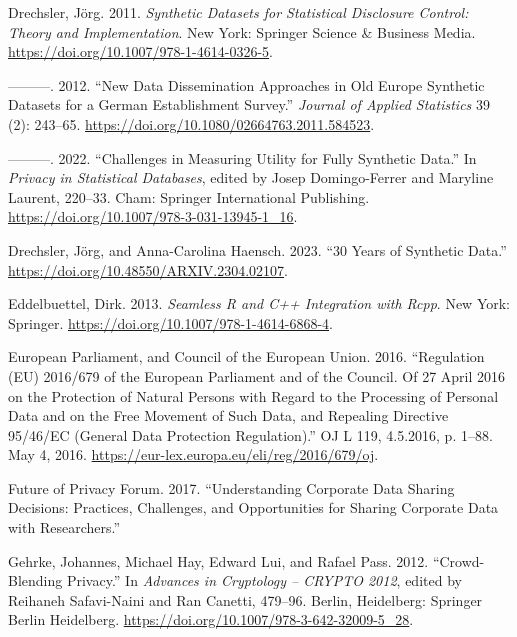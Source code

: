 \documentclass[
]{article}
\newlength{\cslhangindent}
\newenvironment{CSLReferences}[2] %
 {\begin{list}{}{%
  \setlength{\itemindent}{0pt}
  \setlength{\leftmargin}{0pt}
  \setlength{\parsep}{0pt}
  \ifodd #1
   \setlength{\leftmargin}{\cslhangindent}
   \setlength{\itemindent}{-1\cslhangindent}
  \fi
  \setlength{\itemsep}{#2\baselineskip}}}
 {\end{list}}
\begin{document}
\begin{CSLReferences}{1}{0}
Drechsler, Jörg. 2011. \emph{Synthetic Datasets for Statistical
Disclosure Control: Theory and Implementation}. New York: Springer
Science \& Business Media.
\url{https://doi.org/10.1007/978-1-4614-0326-5}.

---------. 2012. {``New Data Dissemination Approaches in Old Europe
{\textendash} Synthetic Datasets for a German Establishment Survey.''}
\emph{Journal of Applied Statistics} 39 (2): 243--65.
\url{https://doi.org/10.1080/02664763.2011.584523}.

---------. 2022. {``Challenges in Measuring Utility for Fully Synthetic
Data.''} In \emph{Privacy in Statistical Databases}, edited by Josep
Domingo-Ferrer and Maryline Laurent, 220--33. Cham: Springer
International Publishing.
\url{https://doi.org/10.1007/978-3-031-13945-1_16}.

Drechsler, Jörg, and Anna-Carolina Haensch. 2023. {``30 Years of
Synthetic Data.''} \url{https://doi.org/10.48550/ARXIV.2304.02107}.

Eddelbuettel, Dirk. 2013. \emph{Seamless {R} and {C++} Integration with
{Rcpp}}. New York: Springer.
\url{https://doi.org/10.1007/978-1-4614-6868-4}.

European Parliament, and Council of the European Union. 2016.
{``Regulation ({EU}) 2016/679 of the {European} {Parliament} and of the
{Council}. Of 27 {April} 2016 on the Protection of Natural Persons with
Regard to the Processing of Personal Data and on the Free Movement of
Such Data, and Repealing {Directive} 95/46/{EC} ({General} {Data}
{Protection} {Regulation}).''} OJ L 119, 4.5.2016, p. 1--88. May 4,
2016. \url{https://eur-lex.europa.eu/eli/reg/2016/679/oj}.

Future of Privacy Forum. 2017. {``Understanding Corporate Data Sharing
Decisions: Practices, Challenges, and Opportunities for Sharing
Corporate Data with Researchers.''}

Gehrke, Johannes, Michael Hay, Edward Lui, and Rafael Pass. 2012.
{``Crowd-Blending Privacy.''} In \emph{Advances in Cryptology -- CRYPTO
2012}, edited by Reihaneh Safavi-Naini and Ran Canetti, 479--96. Berlin,
Heidelberg: Springer Berlin Heidelberg.
\url{https://doi.org/10.1007/978-3-642-32009-5_28}.


\end{CSLReferences}
\end{document}
